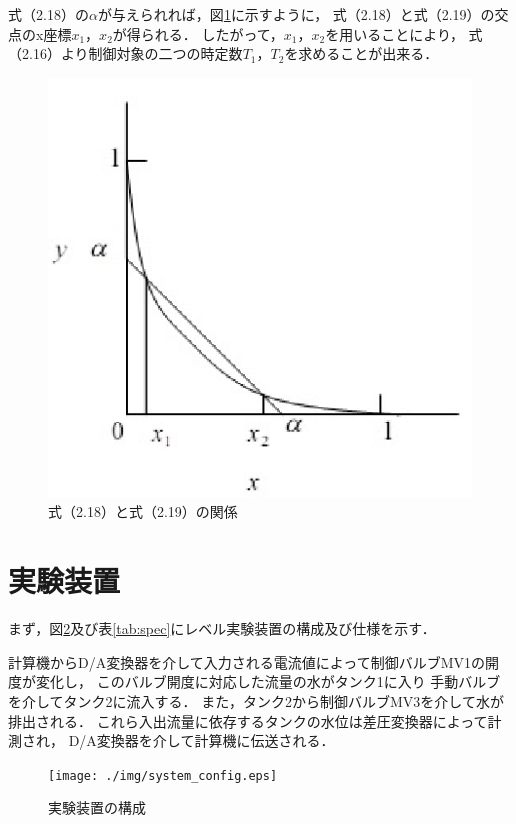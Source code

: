\documentclass[11pt,a4paper]{jsarticle}
\begin{document}
  

  式（2.18）の$\alpha$が与えられれば，図\ref{fig:log}に示すように，
  式（2.18）と式（2.19）の交点のx座標$x_1$，$x_2$が得られる．
  したがって，$x_1$，$x_2$を用いることにより，
  式（2.16）より制御対象の二つの時定数$T_1$，$T_2$を求めることが出来る．\\
  
  \begin{figure}[b]
    \begin{center}
      \includegraphics[width=0.5\hsize]{./img/log_relation.eps}
    \end{center}
    \caption{式（2.18）と式（2.19）の関係}
    \label{fig:log}
  \end{figure}

\section{実験装置}
  \setcounter{equation}{0}
  \setcounter{figure}{0}
  \setcounter{table}{0}
  
  まず，図\ref{fig:config}及び表\ref{tab:spec}にレベル実験装置の構成及び仕様を示す．

  

  計算機からD/A変換器を介して入力される電流値によって制御バルブMV1の開度が変化し，
  このバルブ開度に対応した流量の水がタンク1に入り
  手動バルブを介してタンク2に流入する．
  また，タンク2から制御バルブMV3を介して水が排出される．
  これら入出流量に依存するタンクの水位は差圧変換器によって計測され，
  D/A変換器を介して計算機に伝送される．\\
  
  \begin{figure}[b]
    \begin{center}
      \texttt{[image: ./img/system\_config.eps]}
    \end{center}
    \caption{実験装置の構成}
    \label{fig:config}
  \end{figure}
\end{document}
